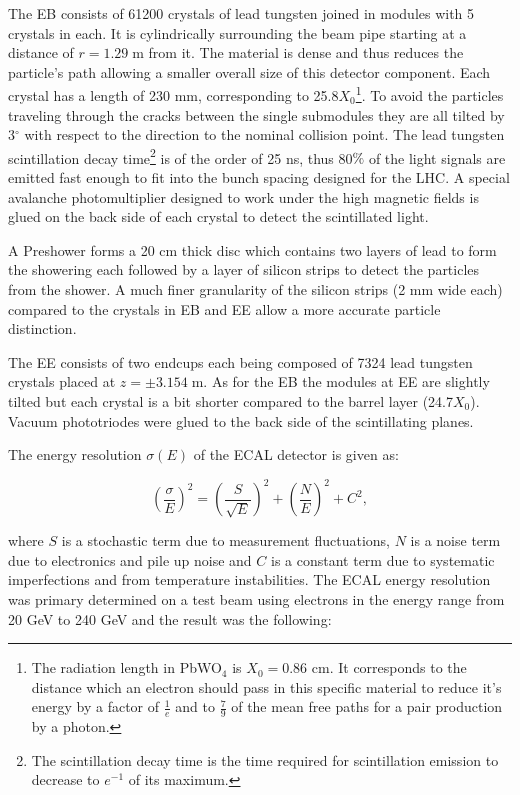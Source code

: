The EB consists of 61200 crystals of lead tungsten joined in modules with 5 crystals in each. It is
cylindrically surrounding the beam pipe starting at a distance of $r = 1.29\;$m from it. 
The material is dense and thus reduces the particle's path allowing a smaller overall size of this detector component. 
Each crystal has a length of 230 mm, corresponding to 25.8$X_{0}$\footnote{The radiation length in PbWO$_{4}$ is 
$X_{0}=0.86$ cm. It corresponds to the distance which an electron should pass in this specific material to reduce it's 
energy by a factor of $\frac{1}{e}$ and to $\frac{7}{9}$ of the mean free paths for a pair production by a photon.}. 
To avoid the particles traveling through the cracks between the single submodules they are all tilted by 3$^{\circ}$ with 
respect to the direction to the nominal collision point. The lead tungsten scintillation decay time\footnote{The scintillation decay 
time is the time required for scintillation emission to decrease to $e^{-1}$ of its maximum.} is of the order of 25 ns, thus 80$\%$ 
of the light signals are emitted fast enough to fit into the bunch spacing designed for the LHC. A special avalanche 
photomultiplier designed to work under the high magnetic fields is glued on the back side of each crystal to detect the scintillated light\cite{APDVPT}.

A Preshower forms a 20 cm thick disc which contains two layers of lead to form the showering each followed by a layer of silicon strips to
detect the particles from the shower. A much finer granularity of the silicon strips (2 mm wide each) compared to the 
crystals in EB and EE allow a more accurate particle distinction.

The EE consists of two endcups each being composed of 7324 lead tungsten crystals placed at $z = \pm 3.154\;$m. As for the EB the modules
at EE are slightly tilted but each crystal is a bit shorter compared to the barrel layer (24.7$X_{0}$). Vacuum phototriodes\cite{APDVPT} were
glued to the back side of the scintillating planes.

The energy resolution $\sigma(E)$ of the ECAL detector is given as\cite{CMSatLHC}:

\begin{equation}\label{eq:resECAL}
  (\frac{\sigma}{E})^{2} = (\frac{S}{\sqrt{E}})^{2} + (\frac{N}{E})^{2} + C^{2},
\end{equation} 

where $S$ is a stochastic term due to measurement fluctuations, $N$ is a noise term due to electronics and pile up noise
and $C$ is a constant term due to systematic imperfections and from temperature instabilities. 
The ECAL energy resolution was primary determined on a test beam using 
electrons in the energy range from 20 GeV to 240 GeV\cite{ECALres2007} and the result was the following:

